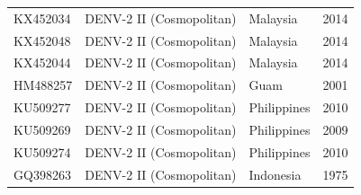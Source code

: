 \begin{longtable}{@{}llll@{}}
KX452034 & DENV-2 II (Cosmopolitan)   & Malaysia     & 2014            \\
KX452048 & DENV-2 II (Cosmopolitan)   & Malaysia     & 2014            \\
KX452044 & DENV-2 II (Cosmopolitan)   & Malaysia     & 2014            \\
HM488257 & DENV-2 II (Cosmopolitan)   & Guam         & 2001            \\
KU509277 & DENV-2 II (Cosmopolitan)   & Philippines  & 2010            \\
KU509269 & DENV-2 II (Cosmopolitan)   & Philippines  & 2009            \\
KU509274 & DENV-2 II (Cosmopolitan)   & Philippines  & 2010            \\
GQ398263 & DENV-2 II (Cosmopolitan)   & Indonesia    & 1975           
\end{longtable}

